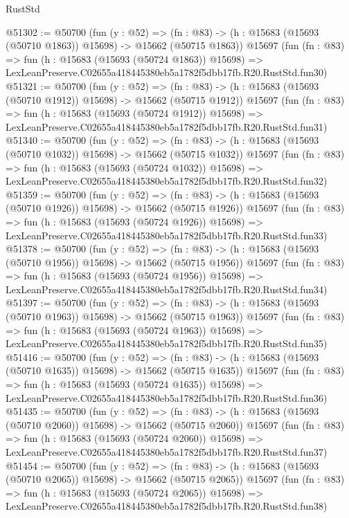 \begin{lexlean}{RustStd}
\begin{coremodule}
@51302 := @50700
    (fun (y : @52) =>
    (fn : @83) -> (h : @15683 (@15693 (@50710 @1863)) @15698) -> @15662 (@50715 @1863))
    @15697
    (fun (fn : @83) =>
    fun (h : @15683 (@15693 (@50724 @1863)) @15698) =>
    LexLeanPreserve.C02655a418445380eb5a1782f5dbb17fb.R20.RustStd.fun30)
@51321 := @50700
    (fun (y : @52) =>
    (fn : @83) -> (h : @15683 (@15693 (@50710 @1912)) @15698) -> @15662 (@50715 @1912))
    @15697
    (fun (fn : @83) =>
    fun (h : @15683 (@15693 (@50724 @1912)) @15698) =>
    LexLeanPreserve.C02655a418445380eb5a1782f5dbb17fb.R20.RustStd.fun31)
@51340 := @50700
    (fun (y : @52) =>
    (fn : @83) -> (h : @15683 (@15693 (@50710 @1032)) @15698) -> @15662 (@50715 @1032))
    @15697
    (fun (fn : @83) =>
    fun (h : @15683 (@15693 (@50724 @1032)) @15698) =>
    LexLeanPreserve.C02655a418445380eb5a1782f5dbb17fb.R20.RustStd.fun32)
@51359 := @50700
    (fun (y : @52) =>
    (fn : @83) -> (h : @15683 (@15693 (@50710 @1926)) @15698) -> @15662 (@50715 @1926))
    @15697
    (fun (fn : @83) =>
    fun (h : @15683 (@15693 (@50724 @1926)) @15698) =>
    LexLeanPreserve.C02655a418445380eb5a1782f5dbb17fb.R20.RustStd.fun33)
@51378 := @50700
    (fun (y : @52) =>
    (fn : @83) -> (h : @15683 (@15693 (@50710 @1956)) @15698) -> @15662 (@50715 @1956))
    @15697
    (fun (fn : @83) =>
    fun (h : @15683 (@15693 (@50724 @1956)) @15698) =>
    LexLeanPreserve.C02655a418445380eb5a1782f5dbb17fb.R20.RustStd.fun34)
@51397 := @50700
    (fun (y : @52) =>
    (fn : @83) -> (h : @15683 (@15693 (@50710 @1963)) @15698) -> @15662 (@50715 @1963))
    @15697
    (fun (fn : @83) =>
    fun (h : @15683 (@15693 (@50724 @1963)) @15698) =>
    LexLeanPreserve.C02655a418445380eb5a1782f5dbb17fb.R20.RustStd.fun35)
@51416 := @50700
    (fun (y : @52) =>
    (fn : @83) -> (h : @15683 (@15693 (@50710 @1635)) @15698) -> @15662 (@50715 @1635))
    @15697
    (fun (fn : @83) =>
    fun (h : @15683 (@15693 (@50724 @1635)) @15698) =>
    LexLeanPreserve.C02655a418445380eb5a1782f5dbb17fb.R20.RustStd.fun36)
@51435 := @50700
    (fun (y : @52) =>
    (fn : @83) -> (h : @15683 (@15693 (@50710 @2060)) @15698) -> @15662 (@50715 @2060))
    @15697
    (fun (fn : @83) =>
    fun (h : @15683 (@15693 (@50724 @2060)) @15698) =>
    LexLeanPreserve.C02655a418445380eb5a1782f5dbb17fb.R20.RustStd.fun37)
@51454 := @50700
    (fun (y : @52) =>
    (fn : @83) -> (h : @15683 (@15693 (@50710 @2065)) @15698) -> @15662 (@50715 @2065))
    @15697
    (fun (fn : @83) =>
    fun (h : @15683 (@15693 (@50724 @2065)) @15698) =>
    LexLeanPreserve.C02655a418445380eb5a1782f5dbb17fb.R20.RustStd.fun38)

\end{coremodule}
\end{lexlean}
